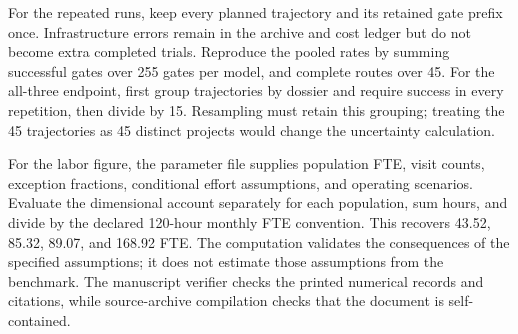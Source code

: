 For the repeated runs, keep every planned trajectory and its retained gate prefix once.
Infrastructure errors remain in the archive and cost ledger but do not become extra completed
trials. Reproduce the pooled rates by summing successful gates over 255 gates per model, and
complete routes over 45. For the all-three endpoint, first group trajectories by dossier and
require success in every repetition, then divide by 15. Resampling must retain this grouping;
treating the 45 trajectories as 45 distinct projects would change the uncertainty calculation.

For the labor figure, the parameter file supplies population FTE, visit counts, exception
fractions, conditional effort assumptions, and operating scenarios. Evaluate the dimensional
account separately for each population, sum hours, and divide by the declared 120-hour monthly
FTE convention. This recovers 43.52, 85.32, 89.07, and 168.92 FTE. The computation validates
the consequences of the specified assumptions; it does not estimate those assumptions from
the benchmark. The manuscript verifier checks the printed numerical records and citations,
while source-archive compilation checks that the document is self-contained.
